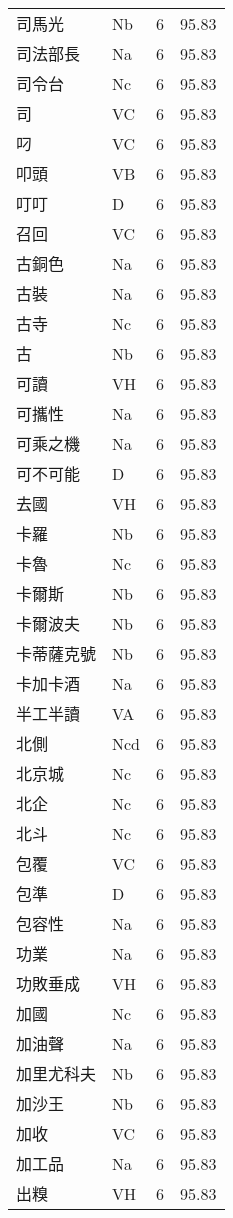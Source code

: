 \documentclass[twocolumn]{book}
\begin{document}
\begin{supertabular}{llrr}
司馬光 & Nb & 6 &  95.83\\
司法部長 & Na & 6 &  95.83\\
司令台 & Nc & 6 &  95.83\\
司 & VC & 6 &  95.83\\
叼 & VC & 6 &  95.83\\
叩頭 & VB & 6 &  95.83\\
叮叮 & D & 6 &  95.83\\
召回 & VC & 6 &  95.83\\
古銅色 & Na & 6 &  95.83\\
古裝 & Na & 6 &  95.83\\
古寺 & Nc & 6 &  95.83\\
古 & Nb & 6 &  95.83\\
可讀 & VH & 6 &  95.83\\
可攜性 & Na & 6 &  95.83\\
可乘之機 & Na & 6 &  95.83\\
可不可能 & D & 6 &  95.83\\
去國 & VH & 6 &  95.83\\
卡羅 & Nb & 6 &  95.83\\
卡魯 & Nc & 6 &  95.83\\
卡爾斯 & Nb & 6 &  95.83\\
卡爾波夫 & Nb & 6 &  95.83\\
卡蒂薩克號 & Nb & 6 &  95.83\\
卡加卡酒 & Na & 6 &  95.83\\
半工半讀 & VA & 6 &  95.83\\
北側 & Ncd & 6 &  95.83\\
北京城 & Nc & 6 &  95.83\\
北企 & Nc & 6 &  95.83\\
北斗 & Nc & 6 &  95.83\\
包覆 & VC & 6 &  95.83\\
包準 & D & 6 &  95.83\\
包容性 & Na & 6 &  95.83\\
功業 & Na & 6 &  95.83\\
功敗垂成 & VH & 6 &  95.83\\
加國 & Nc & 6 &  95.83\\
加油聲 & Na & 6 &  95.83\\
加里尤科夫 & Nb & 6 &  95.83\\
加沙王 & Nb & 6 &  95.83\\
加收 & VC & 6 &  95.83\\
加工品 & Na & 6 &  95.83\\
出糗 & VH & 6 &  95.83\\

\end{supertabular}
\end{document}

